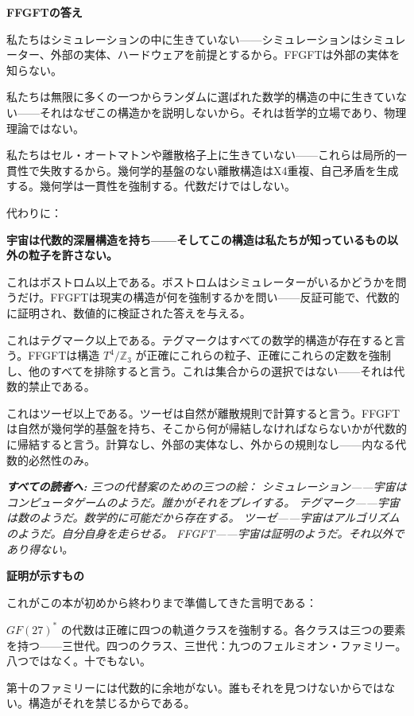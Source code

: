 \documentclass[11pt,openany]{book}
\newenvironment{laierspur}{%
  \par\vspace{4pt}%
  \noindent\small\itshape\color{blue!60!black}%
  \textbf{すべての読者へ:}\enspace\ignorespaces}{%
  \par\vspace{4pt}\normalsize\normalfont\normalcolor}
\begin{document}
\textbf{FFGFTの答え}

私たちはシミュレーションの中に生きていない——シミュレーションはシミュレーター、外部の実体、ハードウェアを前提とするから。FFGFTは外部の実体を知らない。

私たちは無限に多くの一つからランダムに選ばれた数学的構造の中に生きていない——それはなぜこの構造かを説明しないから。それは哲学的立場であり、物理理論ではない。

私たちはセル・オートマトンや離散格子上に生きていない——これらは局所的一貫性で失敗するから。幾何学的基盤のない離散構造はX4重複、自己矛盾を生成する。幾何学は一貫性を強制する。代数だけではしない。

代わりに：

\textbf{宇宙は代数的深層構造を持ち——そしてこの構造は私たちが知っているもの以外の粒子を許さない。}

これはボストロム以上である。ボストロムはシミュレーターがいるかどうかを問うだけ。FFGFTは現実の構造が何を強制するかを問い——反証可能で、代数的に証明され、数値的に検証された答えを与える。

これはテグマーク以上である。テグマークはすべての数学的構造が存在すると言う。FFGFTは構造 $T^4/\mathbb{Z}_3$ が正確にこれらの粒子、正確にこれらの定数を強制し、他のすべてを排除すると言う。これは集合からの選択ではない——それは代数的禁止である。

これはツーゼ以上である。ツーゼは自然が離散規則で計算すると言う。FFGFTは自然が幾何学的基盤を持ち、そこから何が帰結しなければならないかが代数的に帰結すると言う。計算なし、外部の実体なし、外からの規則なし——内なる代数的必然性のみ。

\begin{laierspur}
三つの代替案のための三つの絵：
シミュレーション——宇宙はコンピュータゲームのようだ。誰かがそれをプレイする。
テグマーク——宇宙は数のようだ。数学的に可能だから存在する。
ツーゼ——宇宙はアルゴリズムのようだ。自分自身を走らせる。
FFGFT——宇宙は証明のようだ。それ以外であり得ない。
\end{laierspur}

\textbf{証明が示すもの}

これがこの本が初めから終わりまで準備してきた言明である：

$GF(27)^*$ の代数は正確に四つの軌道クラスを強制する。各クラスは三つの要素を持つ——三世代。四つのクラス、三世代：九つのフェルミオン・ファミリー。八つではなく。十でもない。

第十のファミリーには代数的に余地がない。誰もそれを見つけないからではない。構造がそれを禁じるからである。
\end{document}
